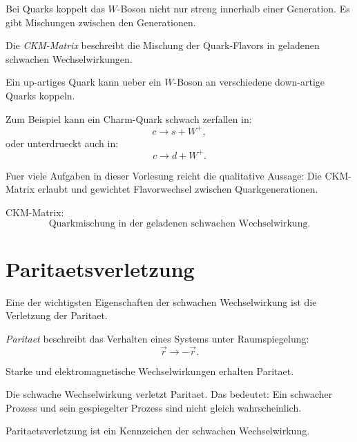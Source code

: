 Bei Quarks koppelt das $W$-Boson nicht nur streng innerhalb einer Generation.
Es gibt Mischungen zwischen den Generationen.

\begin{definitionbox}
Die \emph{CKM-Matrix} beschreibt die Mischung der Quark-Flavors in geladenen
schwachen Wechselwirkungen.
\end{definitionbox}

\begin{conceptbox}
Ein up-artiges Quark kann ueber ein $W$-Boson an verschiedene down-artige Quarks
koppeln.

Zum Beispiel kann ein Charm-Quark schwach zerfallen in:
\[
    c \rightarrow s + W^+,
\]
oder unterdrueckt auch in:
\[
    c \rightarrow d + W^+.
\]
\end{conceptbox}

\begin{notebox}
Fuer viele Aufgaben in dieser Vorlesung reicht die qualitative Aussage:
Die CKM-Matrix erlaubt und gewichtet Flavorwechsel zwischen Quarkgenerationen.
\end{notebox}

\begin{examtipbox}
CKM-Matrix:
\[
    \text{Quarkmischung in der geladenen schwachen Wechselwirkung}.
\]
\end{examtipbox}

\section{Paritaetsverletzung}

Eine der wichtigsten Eigenschaften der schwachen Wechselwirkung ist die Verletzung
der Paritaet.

\begin{definitionbox}
\emph{Paritaet} beschreibt das Verhalten eines Systems unter Raumspiegelung:
\[
    \vec r \rightarrow -\vec r.
\]
\end{definitionbox}

\begin{conceptbox}
Starke und elektromagnetische Wechselwirkungen erhalten Paritaet.

Die schwache Wechselwirkung verletzt Paritaet.
Das bedeutet:
Ein schwacher Prozess und sein gespiegelter Prozess sind nicht gleich wahrscheinlich.
\end{conceptbox}

\begin{examtipbox}
Paritaetsverletzung ist ein Kennzeichen der schwachen Wechselwirkung.
\end{examtipbox}

